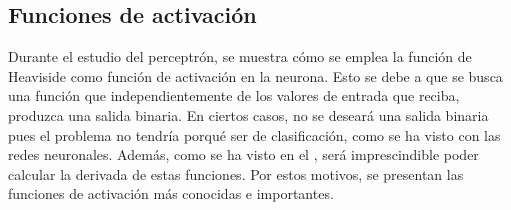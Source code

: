 		\subsection{Funciones de activación}
		
			Durante el estudio del perceptrón, se muestra cómo se emplea la función de Heaviside como función de activación en la neurona. Esto se debe a que se busca una función que independientemente de los valores de entrada que reciba, produzca una salida binaria. En ciertos casos, no se deseará una salida binaria pues el problema no tendría porqué ser de clasificación, como se ha visto con las redes neuronales. Además, como se ha visto en el , será imprescindible poder calcular la derivada de estas funciones. Por estos motivos, se presentan las funciones de activación más conocidas e importantes\cite{funcionesActivacion,softmax}. 
			
